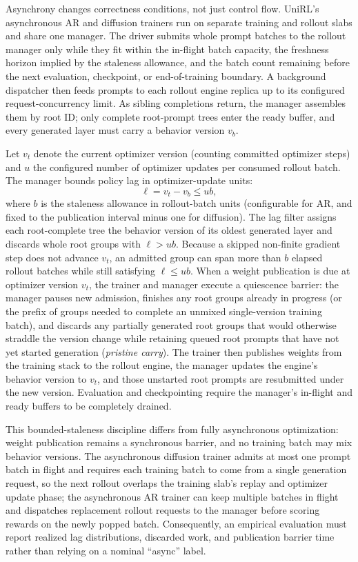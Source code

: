 \documentclass[10pt]{article}
\begin{document}
Asynchrony changes correctness conditions, not just control flow.
UniRL's asynchronous AR and diffusion trainers run on separate training and rollout slabs and share one manager.
The driver submits whole prompt batches to the rollout manager only while they fit within the in-flight batch capacity, the freshness horizon implied by the staleness allowance, and the batch count remaining before the next evaluation, checkpoint, or end-of-training boundary.
A background dispatcher then feeds prompts to each rollout engine replica up to its configured request-concurrency limit.
As sibling completions return, the manager assembles them by root ID; only complete root-prompt trees enter the ready buffer, and every generated layer must carry a behavior version $v_b$.

Let $v_t$ denote the current optimizer version (counting committed optimizer steps) and $u$ the configured number of optimizer updates per consumed rollout batch.
The manager bounds policy lag in optimizer-update units:
\begin{equation}
\ell = v_t-v_b \leq u b,
\end{equation}
where $b$ is the staleness allowance in rollout-batch units (configurable for AR, and fixed to the publication interval minus one for diffusion).
The lag filter assigns each root-complete tree the behavior version of its oldest generated layer and discards whole root groups with $\ell > u b$.
Because a skipped non-finite gradient step does not advance $v_t$, an admitted group can span more than $b$ elapsed rollout batches while still satisfying $\ell \leq u b$.
When a weight publication is due at optimizer version $v_t$, the trainer and manager execute a quiescence barrier: the manager pauses new admission, finishes any root groups already in progress (or the prefix of groups needed to complete an unmixed single-version training batch), and discards any partially generated root groups that would otherwise straddle the version change while retaining queued root prompts that have not yet started generation (\emph{pristine carry}).
The trainer then publishes weights from the training stack to the rollout engine, the manager updates the engine's behavior version to $v_t$, and those unstarted root prompts are resubmitted under the new version.
Evaluation and checkpointing require the manager's in-flight and ready buffers to be completely drained.

This bounded-staleness discipline differs from fully asynchronous optimization: weight publication remains a synchronous barrier, and no training batch may mix behavior versions.
The asynchronous diffusion trainer admits at most one prompt batch in flight and requires each training batch to come from a single generation request, so the next rollout overlaps the training slab's replay and optimizer update phase; the asynchronous AR trainer can keep multiple batches in flight and dispatches replacement rollout requests to the manager before scoring rewards on the newly popped batch.
Consequently, an empirical evaluation must report realized lag distributions, discarded work, and publication barrier time rather than relying on a nominal ``async'' label.
\end{document}
